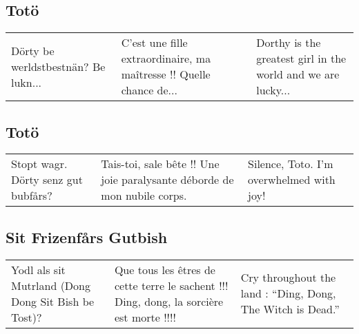\subsection*{Totö}
\begin{tabular}{p{3.7cm}|p{3.7cm}|p{3.7cm}}
Dörty be werldstbestnän? Be lukn...&
C'est une fille extraordinaire, ma maîtresse !! Quelle chance de...&
Dorthy is the greatest girl in the world and we are lucky...
\end{tabular}\par
\subsection*{Totö}
\begin{tabular}{p{3.7cm}|p{3.7cm}|p{3.7cm}}
Stopt wagr. Dörty senz gut bubfårs?&
Tais-toi, sale bête !! Une joie paralysante déborde de mon nubile corps.&
Silence, Toto. I'm overwhelmed with joy!
\end{tabular}\par
\subsection*{Sit Frizenfårs Gutbish}
\begin{tabular}{p{3.7cm}|p{3.7cm}|p{3.7cm}}
Yodl als sit Mutrland (Dong Dong Sit Bish be Tost)? &
Que tous les êtres de cette terre le sachent !!! \og{}Ding, dong, la sorcière est
morte\fg{} !!!!&
Cry throughout the land : ``Ding, Dong, The Witch is Dead.''
\end{tabular}\par
